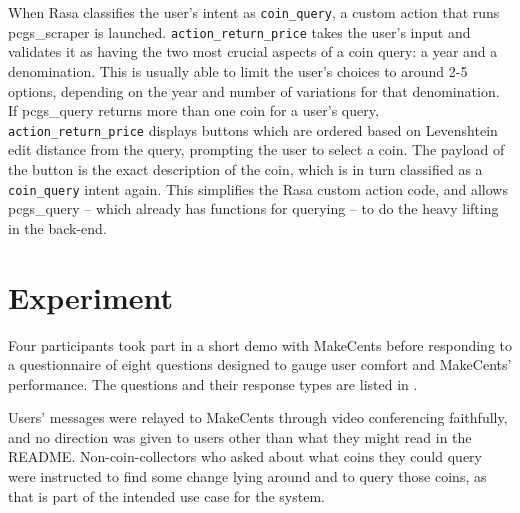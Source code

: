 \documentclass[11pt,a4paper]{article}
\begin{document}
When Rasa classifies the user's intent as \verb|coin_query|, a custom action that runs pcgs\_scraper is launched. \verb|action_return_price| takes the user's input and validates it as having the two most crucial aspects of a coin query: a year and a denomination. This is usually able to limit the user's choices to around 2-5 options, depending on the year and number of variations for that denomination. If pcgs\_query returns more than one coin for a user's query, \verb|action_return_price| displays buttons which are ordered based on Levenshtein edit distance from the query, prompting the user to select a coin. The payload of the button is the exact description of the coin, which is in turn classified as a \verb|coin_query| intent again. This simplifies the Rasa custom action code, and allows pcgs\_query -- which already has functions for querying -- to do the heavy lifting in the back-end.

\section{Experiment}

Four participants took part in a short demo with MakeCents before responding to a questionnaire of eight questions designed to gauge user comfort and MakeCents' performance. The questions and their response types are listed in .

Users' messages were relayed to MakeCents through video conferencing faithfully, and no direction was given to users other than what they might read in the README. Non-coin-collectors who asked about what coins they could query were instructed to find some change lying around and to query those coins, as that is part of the intended use case for the system.
\end{document}
